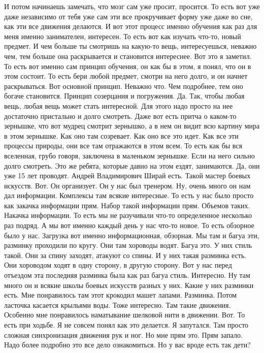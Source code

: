 \A
И потом начинаешь замечать, что мозг сам уже просит, просится.
То есть вот уже даже независимо от тебя уже сам эти все прокручивает форму уже даже во сне,
как эти все движения делаются.
И вот этот процесс именно обучения как раз для меня именно занимателен, интересен.
То есть вот как изучать что-то, новый предмет.
И чем больше ты смотришь на какую-то вещь, интересуешься, неважно чем,
тем больше она раскрывается и становится интереснее.
Вот это я заметил.
То есть вот именно сам принцип обучения, он как бы в этом, я понял, что он в этом состоит.
То есть бери любой предмет, смотри на него долго, и он начнет раскрываться.
Вот основной принцип.
Неважно что.
Чем подробнее, тем оно богаче становится.
Принцип созерцания и погружения.
Да.
Так, чтобы любая вещь, любая вещь может стать интересной.
Для этого надо просто на нее достаточно пристально и долго смотреть.
Даже вот есть притча о каком-то зернышке, что вот мудрец смотрит зернышко,
а в нем он видит всю картину мира в этом зернышке.
Как оно там созревает.
Как оно все это идет.
Как все эти процессы природы, они все там отражаются в этом всем.
То есть как бы вся вселенная, грубо говоря, заключена в маленьком зернышке.
Если на него сильно долго смотреть.
Это же ребята, которые давно на этом ездят, занимаются.
Да, они уже 15 лет проводят.
Андрей Владимирович Ширай есть.
Такой мастер боевых искусств.
Вот.
Он организует.
Он у нас был тренером.
Ну, очень много он нам дал информации.
Комплексы там всякие интересные.
То есть у нас было просто как закачка информации прям.
Набор такой информации прям.
Объемов таких.
Накачка информации.
То есть мы не разучивали что-то определенное несколько раз подряд.
А мы вот именно каждый день у нас что-то новое.
То есть обзорное было у нас.
Загрузка вот именно информационная, обзорная.
Мы там и багуа эти, разминку проходили по кругу.
Они там хороводы водят.
Багуа это.
У них стиль такой.
Они за спину заходят, атакуют со спины.
И у них такая разминка есть.
Они хороводом ходят в одну сторону, в другую сторону.
Вот у нас перед отъездом эта последняя разминка была как раз багуа стиль.
Интересно.
Ну там много он и всякие школы боевых искусств разных у них.
Какие у них разминки есть.
Мне понравилось там этот крокодил машет лапами.
Разминка.
Потом ласточка касается крыльями воды.
Тоже интересно.
Там такие движения.
Особенно мне понравилось наматывание шелковой нити в движении.
Вот.
То есть при ходьбе.
Я не совсем понял как это делается.
Я запутался.
Там просто сложная синхронизация движения рук и ног.
Но мне прям это.
Прям запало.
Надо более подробно это все дело ознакомиться.
Но у вас вроде есть так дети?
